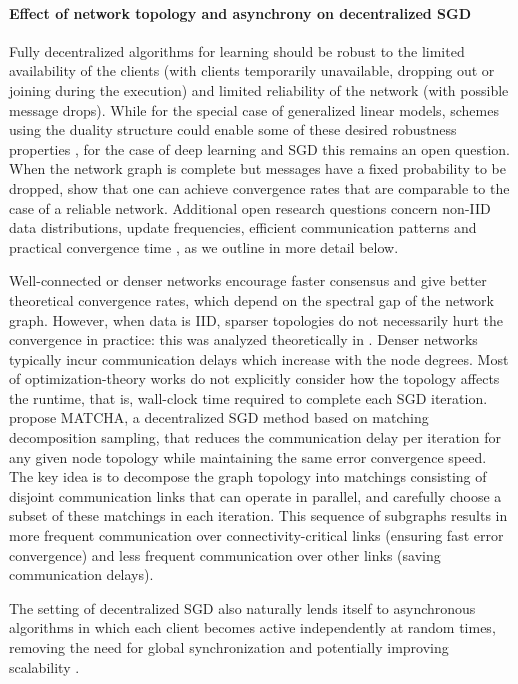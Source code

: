 \documentclass[11pt]{article}
\begin{document}
\paragraph{Effect of network topology and asynchrony on decentralized SGD}
Fully decentralized algorithms for learning should be robust to the limited availability of the clients (with clients temporarily unavailable, dropping out or joining during the execution) and limited reliability of the network (with possible message drops). While for the special case of generalized linear models, schemes using the duality structure could enable some of these desired robustness properties \citep{he2018cola}, for the case of deep learning and SGD this remains an open question.
When the network graph is complete but messages have a fixed probability to be dropped, \citet{yu2018distributed} show that one can achieve convergence rates that are comparable to the case of a reliable network.
Additional open research questions concern non-IID data distributions, update frequencies, efficient communication patterns and practical convergence time \citep{Tang2018}, as we outline in more detail below.

Well-connected or denser networks encourage faster consensus and give better theoretical convergence rates, which depend on the spectral gap of the network graph. However, when data is IID, sparser topologies do not necessarily hurt the convergence in practice: this was analyzed theoretically in \cite{neglia2020}. Denser networks typically incur communication delays which increase with the node degrees. Most of optimization-theory works do not explicitly consider how the topology affects the runtime, that is, wall-clock time required to complete each SGD iteration. \citet{wang2019matcha} propose MATCHA, a decentralized SGD method based on matching decomposition sampling, that reduces the communication delay per iteration for any given node topology while maintaining the same error convergence speed. The key idea is to decompose the graph topology into matchings consisting of disjoint communication links that can operate in parallel, and carefully choose a subset of these matchings in each iteration. This sequence of subgraphs results in more frequent communication over connectivity-critical links (ensuring fast error convergence) and less frequent communication over other links (saving communication delays).

The setting of decentralized SGD also naturally lends itself to asynchronous algorithms in which each client becomes active independently at random times, removing the need for global synchronization and potentially improving scalability \citep{Colin2016,Vanhaesebrouck2017,Bellet2018a,assran2019stochastic,Lian2018}.
\end{document}

